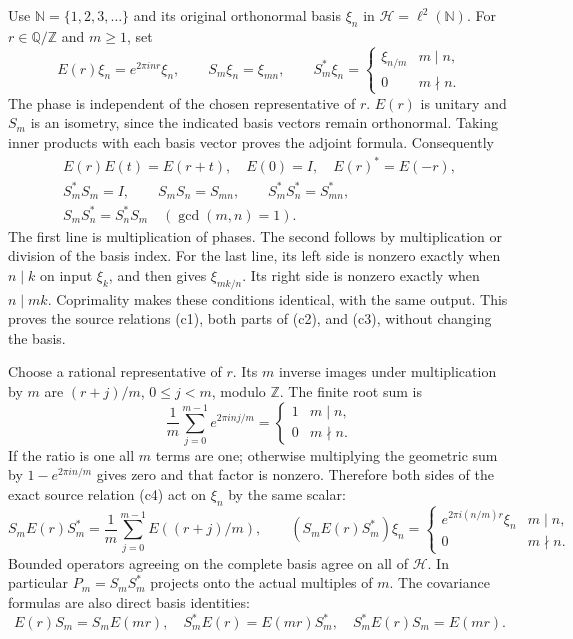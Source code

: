 Use $\mathbb N=\{1,2,3,\ldots\}$ and its original orthonormal
basis $\xi_n$ in $\mathcal H=\ell^2(\mathbb N)$. For
$r\in\mathbb Q/\mathbb Z$ and $m\ge1$, set
\begin{equation}\tag{HCR1}
 E(r)\xi_n=e^{2\pi i n r}\xi_n,\qquad
 S_m\xi_n=\xi_{mn},\qquad
 S_m^*\xi_n=
 \begin{cases}\xi_{n/m}&m\mid n,\\0&m\nmid n.\end{cases}
\end{equation}
The phase is independent of the chosen representative of $r$.
$E(r)$ is unitary and $S_m$ is an isometry, since the indicated
basis vectors remain orthonormal. Taking inner products with
each basis vector proves the adjoint formula. Consequently
\begin{equation}\tag{HCR2}
\begin{gathered}
 E(r)E(t)=E(r+t),\quad E(0)=I,\quad E(r)^*=E(-r),\\
 S_m^*S_m=I,\qquad
 S_mS_n=S_{mn},\qquad S_m^*S_n^*=S_{mn}^*,\\
 S_mS_n^*=S_n^*S_m\quad(\gcd(m,n)=1).
\end{gathered}
\end{equation}
The first line is multiplication of phases. The second follows
by multiplication or division of the basis index. For the last
line, its left side is nonzero exactly when $n\mid k$ on input
$\xi_k$, and then gives $\xi_{mk/n}$. Its right side is nonzero
exactly when $n\mid mk$. Coprimality makes these conditions
identical, with the same output. This proves the source relations
(c1), both parts of (c2), and (c3), without changing the basis.

Choose a rational representative of $r$. Its $m$ inverse images
under multiplication by $m$ are $(r+j)/m$, $0\le j<m$,
modulo $\mathbb Z$. The finite root sum is
\begin{equation}\tag{HCR3}
 \frac1m\sum_{j=0}^{m-1}e^{2\pi i n j/m}
       =\begin{cases}1&m\mid n,\\0&m\nmid n.\end{cases}
\end{equation}
If the ratio is one all $m$ terms are one; otherwise multiplying
the geometric sum by $1-e^{2\pi i n/m}$ gives zero and that
factor is nonzero. Therefore both sides of the exact source
relation (c4) act on $\xi_n$ by the same scalar:
\begin{equation}\tag{HCR4}
 S_mE(r)S_m^*
       =\frac1m\sum_{j=0}^{m-1}E((r+j)/m),\qquad
 (S_mE(r)S_m^*)\xi_n=
 \begin{cases}e^{2\pi i(n/m)r}\xi_n&m\mid n,\\0&m\nmid n.
 \end{cases}
\end{equation}
Bounded operators agreeing on the complete basis agree on all
of $\mathcal H$. In particular $P_m=S_mS_m^*$ projects onto
the actual multiples of $m$. The covariance formulas are also
direct basis identities:
\begin{equation}\tag{HCR5}
 E(r)S_m=S_mE(mr),\quad
 S_m^*E(r)=E(mr)S_m^*,\quad S_m^*E(r)S_m=E(mr).
\end{equation}

